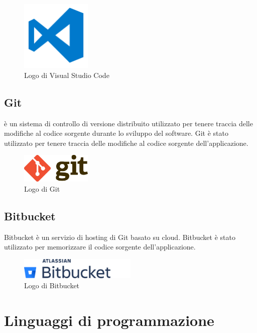 \begin{figure}[h]
  \centering
  \includegraphics[width=0.3\textwidth]{img/tecnologie/vscode.png}
  \caption{Logo di Visual Studio Code}
  \label{fig:vscode}
\end{figure}

\subsection{Git}
 è un sistema di controllo di versione distribuito utilizzato per tenere traccia delle modifiche al codice sorgente durante lo sviluppo del software. Git è stato utilizzato per tenere traccia delle modifiche al codice sorgente dell'applicazione.

\begin{figure}[h]
  \centering
  \includegraphics[width=0.3\textwidth]{img/tecnologie/git.png}
  \caption{Logo di Git}
  \label{fig:git}
\end{figure}

\subsection{Bitbucket}
Bitbucket è un servizio di hosting di  Git basato su cloud. Bitbucket è stato utilizzato per memorizzare il codice sorgente dell'applicazione.

\begin{figure}[h]
  \centering
  \includegraphics[width=0.5\textwidth]{img/tecnologie/bitbucket.png}
  \caption{Logo di Bitbucket}
  \label{fig:bitbucket}
\end{figure}

\section{Linguaggi di programmazione}
